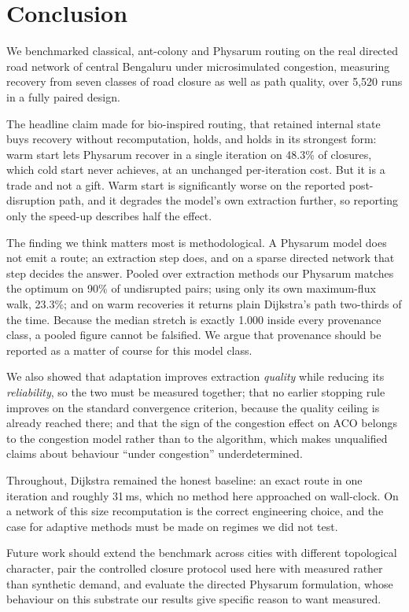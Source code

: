 \section{Conclusion}

We benchmarked classical, ant-colony and Physarum routing on the real
directed road network of central Bengaluru under microsimulated congestion,
measuring recovery from seven classes of road closure as well as path
quality, over 5{,}520 runs in a fully paired design.

The headline claim made for bio-inspired routing, that retained internal
state buys recovery without recomputation, holds, and holds in its
strongest form: warm start lets Physarum recover in a single iteration on
48.3\% of closures, which cold start never achieves, at an unchanged
per-iteration cost. But it is a trade and not a gift. Warm start is
significantly worse on the reported post-disruption path, and it degrades the
model's own extraction further, so reporting only the speed-up describes half
the effect.

The finding we think matters most is methodological. A Physarum model does
not emit a route; an extraction step does, and on a sparse directed network
that step decides the answer. Pooled over extraction methods our Physarum
matches the optimum on 90\% of undisrupted pairs; using only its own
maximum-flux walk, 23.3\%; and on warm recoveries it returns plain
Dijkstra's path two-thirds of the time. Because the median stretch is
exactly 1.000 inside every provenance class, a pooled figure cannot be
falsified. We argue that provenance should be reported as a matter of course
for this model class.

We also showed that adaptation improves extraction \emph{quality} while
reducing its \emph{reliability}, so the two must be measured together; that
no earlier stopping rule improves on the standard convergence criterion,
because the quality ceiling is already reached there; and that the sign of
the congestion effect on ACO belongs to the congestion model rather than to
the algorithm, which makes unqualified claims about behaviour ``under
congestion'' underdetermined.

Throughout, Dijkstra remained the honest baseline: an exact route in one
iteration and roughly 31\,ms, which no method here approached on wall-clock.
On a network of this size recomputation is the correct engineering choice,
and the case for adaptive methods must be made on regimes we did not test.

Future work should extend the benchmark across cities with different
topological character, pair the controlled closure protocol used here with
measured rather than synthetic demand, and evaluate the directed Physarum
formulation, whose behaviour on this substrate our results give specific
reason to want measured.

